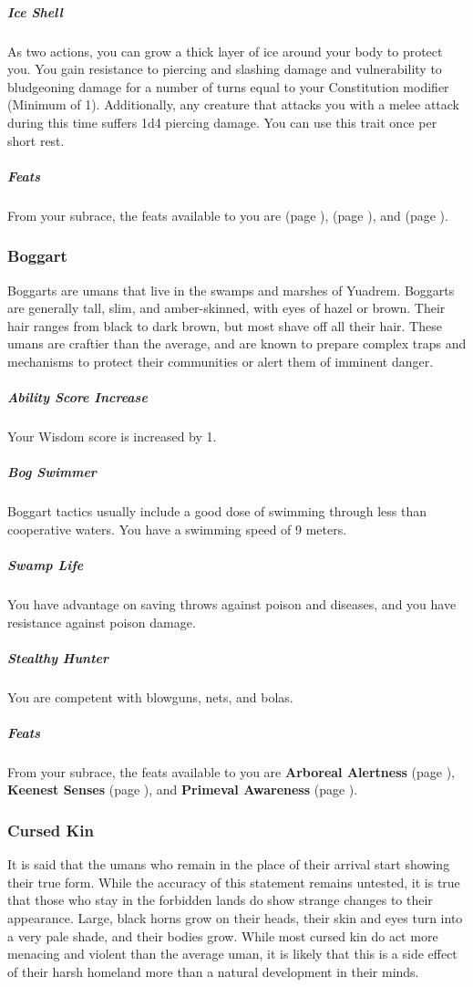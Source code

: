     \subparagraph{Ice Shell} As two actions, you can grow a thick layer of ice around your body to protect you.
    You gain resistance to piercing and slashing damage and vulnerability to bludgeoning damage for a number of turns equal to your Constitution modifier (Minimum of 1).
    Additionally, any creature that attacks you with a melee attack during this time suffers 1d4 piercing damage.
    You can use this trait once per short rest.

    \subparagraph{Feats} From your subrace, the feats available to you are
    \textbf{} (page \pageref{feat::}),
    \textbf{} (page \pageref{feat::}), and
    \textbf{} (page \pageref{feat::}).

\subsubsection{Boggart}
    Boggarts are umans that live in the swamps and marshes of Yuadrem.
    Boggarts are generally tall, slim, and amber-skinned, with eyes of hazel or brown.
    Their hair ranges from black to dark brown, but most shave off all their hair.
    These umans are craftier than the average, and are known to prepare complex traps and mechanisms to protect their communities or alert them of imminent danger.

    \subparagraph{Ability Score Increase} Your Wisdom score is increased by 1.

    \subparagraph{Bog Swimmer} Boggart tactics usually include a good dose of swimming through less than cooperative waters.
    You have a swimming speed of 9 meters.

    \subparagraph{Swamp Life} You have advantage on saving throws against poison and diseases, and you have resistance against poison damage.

    \subparagraph{Stealthy Hunter} You are competent with blowguns, nets, and bolas.

    \subparagraph{Feats} From your subrace, the feats available to you are
    \textbf{Arboreal Alertness} (page \pageref{feat::arborealalertness}),
    \textbf{Keenest Senses} (page \pageref{feat::keenestsenses}), and
    \textbf{Primeval Awareness} (page \pageref{feat::primevalawareness}).

\subsubsection{Cursed Kin}
    It is said that the umans who remain in the place of their arrival start showing their true form.
    While the accuracy of this statement remains untested, it is true that those who stay in the forbidden lands do show strange changes to their appearance.
    Large, black horns grow on their heads, their skin and eyes turn into a very pale shade, and their bodies grow.
    While most cursed kin do act more menacing and violent than the average uman, it is likely that this is a side effect of their harsh homeland more than a natural development in their minds.

